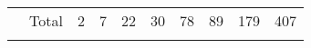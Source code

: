 \begin{table}[]
{\begin{tabular}{lrcccccccc}
            \multicolumn{1}{l|}{} & \multicolumn{1}{r|}{Total}             & 2                                  & 7                               & 22                              & 30                              & 78                              & 89                              & \multicolumn{1}{c|}{179                       } & \multicolumn{1}{c|}{407}            \\ \cline{2-10}
                                  & \multicolumn{1}{l}{}                   & \multicolumn{1}{l}{}               & \multicolumn{1}{l}{}            & \multicolumn{1}{l}{}            & \multicolumn{1}{l}{}            & \multicolumn{1}{l}{}            & \multicolumn{1}{l}{}            & \multicolumn{1}{l}{}                            &                                     \\ \cline{2-10}


\end{tabular}}
\end{table}
